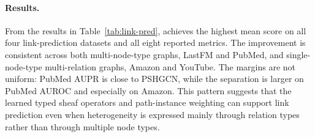 \paragraph{Results.} From the results in Table~\ref{tab:link-pred}, \method{} achieves the highest mean score on all four link-prediction datasets and all eight reported metrics. The improvement is consistent across both multi-node-type graphs, LastFM and PubMed, and single-node-type multi-relation graphs, Amazon and YouTube. The margins are not uniform: PubMed AUPR is close to PSHGCN, while the separation is larger on PubMed AUROC and especially on Amazon. This pattern suggests that the learned typed sheaf operators and \ampss{} path-instance weighting can support link prediction even when heterogeneity is expressed mainly through relation types rather than through multiple node types.


